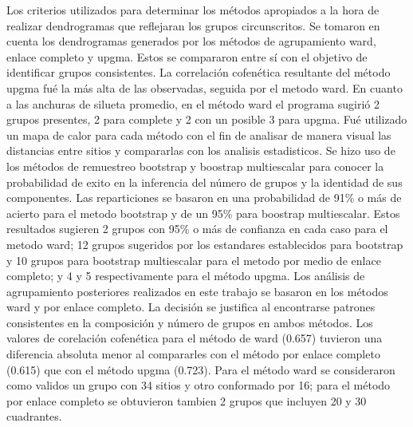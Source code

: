\documentclass[11pt,]{article}
\begin{document}
Los criterios utilizados para determinar los métodos apropiados a la
hora de realizar dendrogramas que reflejaran los grupos circunscritos.
Se tomaron en cuenta los dendrogramas generados por los métodos de
agrupamiento ward, enlace completo y upgma. Estos se compararon entre sí
con el objetivo de identificar grupos consistentes. La correlación
cofenética resultante del método upgma fué la más alta de las
observadas, seguida por el metodo ward. En cuanto a las anchuras de
silueta promedio, en el método ward el programa sugirió 2 grupos
presentes, 2 para complete y 2 con un posible 3 para upgma. Fué
utilizado un mapa de calor para cada método con el fin de analisar de
manera visual las distancias entre sitios y compararlas con los analisis
estadisticos. Se hizo uso de los métodos de remuestreo bootstrap y
boostrap multiescalar para conocer la probabilidad de exito en la
inferencia del número de grupos y la identidad de sus componentes. Las
reparticiones se basaron en una probabilidad de 91\% o más de acierto
para el metodo bootstrap y de un 95\% para boostrap multiescalar. Estos
resultados sugieren 2 grupos con 95\% o más de confianza en cada caso
para el metodo ward; 12 grupos sugeridos por los estandares establecidos
para bootstrap y 10 grupos para bootstrap multiescalar para el metodo
por medio de enlace completo; y 4 y 5 respectivamente para el método
upgma. Los análisis de agrupamiento posteriores realizados en este
trabajo se basaron en los métodos ward y por enlace completo. La
decisión se justifica al encontrarse patrones consistentes en la
composición y número de grupos en ambos métodos. Los valores de
corelación cofenética para el método de ward (0.657) tuvieron una
diferencia absoluta menor al compararles con el método por enlace
completo (0.615) que con el método upgma (0.723). Para el método ward se
consideraron como validos un grupo con 34 sitios y otro conformado por
16; para el método por enlace completo se obtuvieron tambien 2 grupos
que incluyen 20 y 30 cuadrantes.
\end{document}
